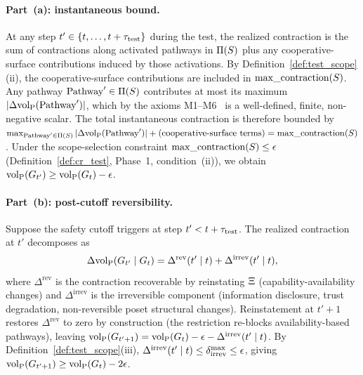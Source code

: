 \paragraph{Part~(a): instantaneous bound.}
At any step $t' \in \{t, \ldots, t + \tau_{\mathrm{test}}\}$ during the
test, the realized contraction is the sum of contractions along
activated pathways in $\Pi(S)$ plus any cooperative-surface
contributions induced by those activations.  By
Definition~\ref{def:test_scope}(ii), the cooperative-surface
contributions are included in $\mathrm{max\_contraction}(S)$.  Any pathway
$\mathrm{Pathway}' \in \Pi(S)$ contributes at most its maximum
$|\Delta {\operatorname{vol}_{\mathrm{P}}}(\mathrm{Pathway}')|$, which by the axioms
M1--M6~\citep[Proposition~1]{lasser2026poset} is a
well-defined, finite, non-negative scalar.  The total
instantaneous contraction is therefore bounded by
$\max_{\mathrm{Pathway}' \in \Pi(S)} |\Delta {\operatorname{vol}_{\mathrm{P}}}(\mathrm{Pathway}')|
 + \text{(cooperative-surface terms)} = \mathrm{max\_contraction}(S)$.
Under the scope-selection constraint
$\mathrm{max\_contraction}(S) \leq \epsilon$
(Definition~\ref{def:cr_test}, Phase~1, condition~(ii)), we
obtain ${\operatorname{vol}_{\mathrm{P}}}(G_{t'}) \geq {\operatorname{vol}_{\mathrm{P}}}(G_t) - \epsilon$.

\paragraph{Part~(b): post-cutoff reversibility.}
Suppose the safety cutoff triggers at step $t' <
t + \tau_{\mathrm{test}}$.  The realized contraction at $t'$ decomposes as
$$
\Delta {\operatorname{vol}_{\mathrm{P}}}(G_{t'} \mid G_t)
  = \Delta^{\mathrm{rev}}(t' \mid t)
  + \Delta^{\mathrm{irrev}}(t' \mid t),
$$
where $\Delta^{\mathrm{rev}}$ is the contraction recoverable by
reinstating $\Xi$ (capability-availability changes) and
$\Delta^{\mathrm{irrev}}$ is the irreversible component
(information disclosure, trust degradation, non-reversible
poset structural changes).
Reinstatement at $t' + 1$ restores $\Delta^{\mathrm{rev}}$ to
zero by construction (the restriction re-blocks
availability-based pathways), leaving
${\operatorname{vol}_{\mathrm{P}}}(G_{t'+1}) = {\operatorname{vol}_{\mathrm{P}}}(G_t)
 - \epsilon - \Delta^{\mathrm{irrev}}(t' \mid t)$.
By Definition~\ref{def:test_scope}(iii),
$\Delta^{\mathrm{irrev}}(t' \mid t)
 \leq \delta_{\mathrm{irrev}}^{\max} \leq \epsilon$,
giving
${\operatorname{vol}_{\mathrm{P}}}(G_{t'+1}) \geq {\operatorname{vol}_{\mathrm{P}}}(G_t) - 2\epsilon$.

